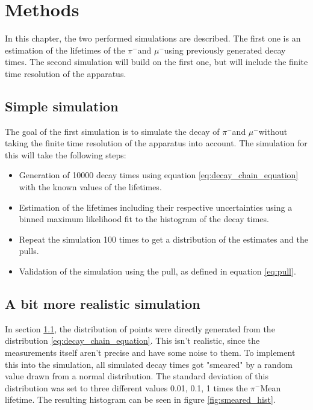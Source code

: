 \documentclass[11pt, a4paper, oneside]{book}
\newcommand{\pion}{$\pi^{-}$}
\newcommand{\muon}{$\mu^{-}$}
\begin{document}
\FloatBarrier
\chapter{Methods}
In this chapter, the two performed simulations are described. The first one is an estimation of the lifetimes of the \pion and \muon using previously generated decay times. The second simulation will build on the first one, but will include the finite time resolution of the apparatus. 

\section{Simple simulation} \label{sec:simple_simulation}
The goal of the first simulation is to simulate the decay of \pion and \muon without taking the finite time resolution of the apparatus into account. The simulation for this will take the following steps:
\begin{itemize}
  \item Generation of \num{10000} decay times using equation \ref{eq:decay_chain_equation} with the known    values of the lifetimes.
  \item Estimation of the lifetimes including their respective uncertainties using a binned maximum likelihood fit to the histogram of the decay times.
  \item Repeat the simulation \num{100} times to get a distribution of the estimates and the pulls.
  \item Validation of the simulation using the pull, as defined in equation \ref{eq:pull}.
\end{itemize}

\section{A bit more realistic simulation} \label{sec:realistic_simulation}
In section \ref{sec:simple_simulation}, the distribution of points were directly generated from the distribution \ref{eq:decay_chain_equation}. This isn't realistic, since the measurements itself aren't precise and have some noise to them. To implement this into the simulation, all simulated decay times got "smeared" by a random value drawn from a normal distribution. The standard deviation of this distribution was set to three different values 0.01, 0.1, 1 times the \pion Mean lifetime. The resulting histogram can be seen in figure \ref{fig:smeared_hist}.
\end{document}
